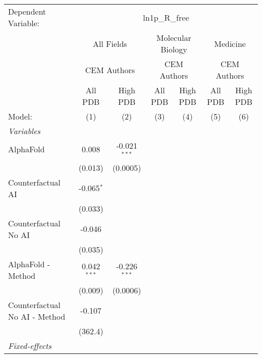 \begingroup
\centering
\begin{tabular}{lcccccc}
   \tabularnewline \midrule \midrule
   Dependent Variable: & \multicolumn{6}{c}{ln1p\_R\_free}\\
 & \multicolumn{2}{c}{All Fields} & \multicolumn{2}{c}{Molecular Biology} & \multicolumn{2}{c}{Medicine} \\
\cmidrule(lr){2-3} \cmidrule(lr){4-5} \cmidrule(lr){6-7}
 & \multicolumn{2}{c}{CEM Authors} & \multicolumn{2}{c}{CEM Authors} & \multicolumn{2}{c}{CEM Authors} \\
\cmidrule(lr){2-3} \cmidrule(lr){4-5} \cmidrule(lr){6-7}
 & \multicolumn{1}{c}{All PDB} & \multicolumn{1}{c}{High PDB} & \multicolumn{1}{c}{All PDB} & \multicolumn{1}{c}{High PDB} & \multicolumn{1}{c}{All PDB} & \multicolumn{1}{c}{High PDB} \\
\cmidrule(lr){2-2} \cmidrule(lr){3-3} \cmidrule(lr){4-4} \cmidrule(lr){5-5} \cmidrule(lr){6-6} \cmidrule(lr){7-7}
   Model:                        & (1)           & (2)            & (3) & (4) & (5) & (6)\\  
   \midrule
   \emph{Variables}\\
   AlphaFold                     & 0.008         & -0.021$^{***}$ &     &     &     &   \\   
                                 & (0.013)       & (0.0005)       &     &     &     &   \\   
   Counterfactual AI             & -0.065$^{*}$  &                &     &     &     &   \\   
                                 & (0.033)       &                &     &     &     &   \\   
   Counterfactual No AI          & -0.046        &                &     &     &     &   \\   
                                 & (0.035)       &                &     &     &     &   \\   
   AlphaFold - Method            & 0.042$^{***}$ & -0.226$^{***}$ &     &     &     &   \\   
                                 & (0.009)       & (0.0006)       &     &     &     &   \\   
   Counterfactual No AI - Method & -0.107        &                &     &     &     &   \\   
                                 & (362.4)       &                &     &     &     &   \\   
   \midrule
   \emph{Fixed-effects}\\

\end{tabular}
